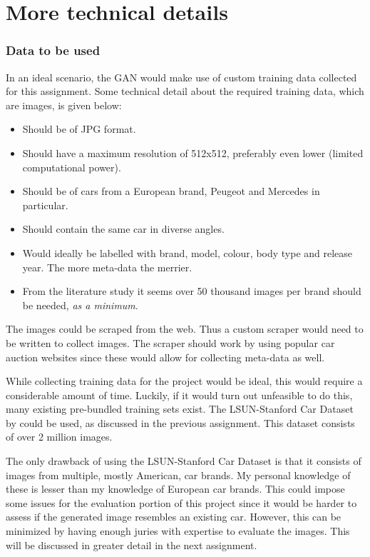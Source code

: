 \part{More technical details}
\label{part:technical_details}


\section{Data to be used}
\label{sec:data}

In an ideal scenario, the GAN would make use of custom training data collected for this assignment.
Some technical detail about the required training data, which are images, is given below:
\begin{itemize}
    \item Should be of JPG format.
    \item Should have a maximum resolution of 512x512, preferably even lower (limited computational power).
    \item Should be of cars from a European brand, Peugeot and Mercedes in particular.
    \item Should contain the same car in diverse angles.
    \item Would ideally be labelled with brand, model, colour, body type and release year. The more meta-data the merrier.
    \item From the literature study it seems over 50 thousand images per brand should be needed, \textit{as a minimum}.
\end{itemize}

The images could be scraped from the web.
Thus a custom scraper would need to be written to collect images.
The scraper should work by using popular car auction websites since these would allow for collecting meta-data as well.

While collecting training data for the project would be ideal, this would require a considerable amount of time.
Luckily, if it would turn out unfeasible to do this, many existing pre-bundled training sets exist.
The LSUN-Stanford Car Dataset by \citet{cardb} could be used, as discussed in the previous assignment.
This dataset consists of over 2 million images.

The only drawback of using the LSUN-Stanford Car Dataset is that it consists of images from multiple, mostly American, car brands.
My personal knowledge of these is lesser than my knowledge of European car brands.
This could impose some issues for the evaluation portion of this project since it would be harder to assess if the generated image resembles an existing car.
However, this can be minimized by having enough juries with expertise to evaluate the images.
This will be discussed in greater detail in the next assignment. 

